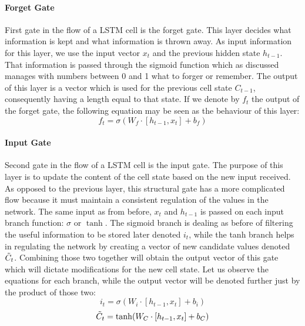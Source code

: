 \newpage

\paragraph{Forget Gate}\mbox{} 

\vspace{5mm}

First gate in the flow of a LSTM cell is the forget gate. This layer decides what information is kept and what information is thrown away. As input information for this layer, we use the input vector $\displaystyle x_t$ and the previous hidden state $\displaystyle h_{t-1}$. That information is passed through the sigmoid function which as discussed manages with numbers between 0 and 1 what to forger or remember. The output of this layer is a vector which is used for the previous cell state $\displaystyle C_{t-1}$, consequently having a length equal to that state. If we denote by $\displaystyle f_t$ the output of the forget gate, the following equation may be seen as the behaviour of this layer:
\[ f_t = \sigma(W_f\cdot[h_{t-1}, x_t] + b_f) \]

\paragraph{Input Gate}\mbox{} 

\vspace{5mm}

Second gate in the flow of a LSTM cell is the input gate. The purpose of this layer is to update the content of the cell state based on the new input received. As opposed to the previous layer, this structural gate has a more complicated flow because it must maintain a consistent regulation of the values in the network. The same input as from before, $\displaystyle x_t$ and $\displaystyle h_{t-1}$ is passed on each input branch function: $\displaystyle \sigma$ or $\displaystyle \tanh$. The sigmoid branch is dealing as before of filtering the useful information to be stored later denoted $\displaystyle i_t$, while the tanh branch helps in regulating the network by creating a vector of new candidate values denoted $\displaystyle \Tilde{C}_t$. Combining those two together will obtain the output vector of this gate which will dictate modifications for the new cell state. Let us observe the equations for each branch, while the output vector will be denoted further just by the product of those two:
\[ i_t = \sigma(W_i\cdot[h_{t-1}, x_t] + b_i)\]
\[ \Tilde{C}_t = \tanh(W_C\cdot[h_{t-1}, x_t] + b_C)\]

